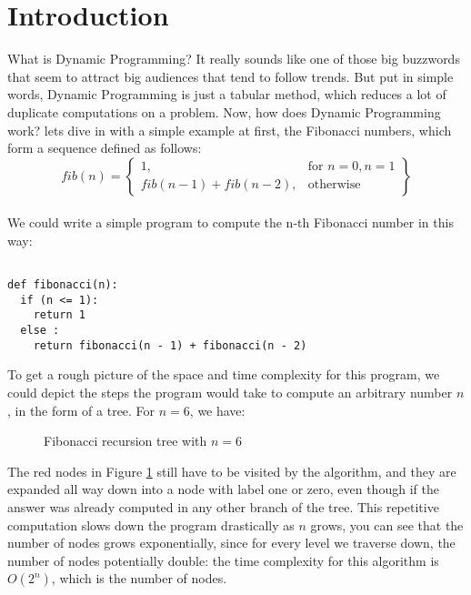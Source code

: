 
 
 \section{Introduction}


What is Dynamic Programming? It really sounds like one of those big buzzwords that seem to
attract big audiences that tend to follow trends. But put in simple words, Dynamic Programming is just a tabular method, 
which reduces a lot of duplicate computations on a problem. Now, how does Dynamic Programming work? lets dive in with a simple example at first, the Fibonacci numbers,
which form a sequence defined as follows:
  \\
  \[
    fib(n) = \left\{\begin{array}{lr}
      1, & \text{for } n = 0, n = 1\\
      fib(n-1) + fib(n-2), & \text{otherwise}
      \end{array}\right\}
  \]
  \\

We could write a simple program to compute the n-th Fibonacci number in this way:

\begin{verbatim}

def fibonacci(n):
  if (n <= 1):
    return 1
  else :
    return fibonacci(n - 1) + fibonacci(n - 2)

\end{verbatim}


To get a rough picture of the space and time complexity for this program, we could depict the steps
the program would take to compute an arbitrary number $n$, in the form of a tree. For $n = 6$, we have:


\begin{figure}[ht]
  \centering
  \caption{Fibonacci recursion tree with $n = 6$}
  \label{fig:fib1}
\end{figure}

The red nodes in Figure \ref{fig:fib1} still have to be visited by the algorithm, and they are expanded all 
way down into a node with label one or zero, even though if the answer was already computed in any other 
branch of the tree. This repetitive computation slows down the program drastically as $n$ grows,
you can see that the number of nodes grows exponentially, since for every level we traverse down,
the number of nodes potentially double: the time complexity for this algorithm is $O(2^n)$, which is 
the number of nodes.

